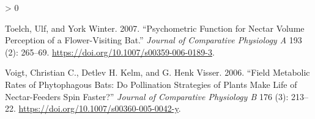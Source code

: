 \documentclass[
]{article}
\newlength{\cslhangindent}
\newenvironment{CSLReferences}[2] %
 {%
  \setlength{\parindent}{0pt}
  \ifodd #1 \everypar{\setlength{\hangindent}{\cslhangindent}}\ignorespaces\fi
  \ifnum #2 > 0
  \setlength{\parskip}{#2\baselineskip}
  \fi
 }%
 {}
\begin{document}
\begin{CSLReferences}{1}{0}
\leavevmode\hypertarget{ref-toelch_psychometric_2007}{}%
Toelch, Ulf, and York Winter. 2007. {``Psychometric Function for Nectar Volume Perception of a Flower-Visiting Bat.''} \emph{Journal of Comparative Physiology A} 193 (2): 265--69. \url{https://doi.org/10.1007/s00359-006-0189-3}.

\leavevmode\hypertarget{ref-voigt_field_2006}{}%
Voigt, Christian C., Detlev H. Kelm, and G. Henk Visser. 2006. {``Field Metabolic Rates of Phytophagous Bats: Do Pollination Strategies of Plants Make Life of Nectar-Feeders Spin Faster?''} \emph{Journal of Comparative Physiology B} 176 (3): 213--22. \url{https://doi.org/10.1007/s00360-005-0042-y}.

\end{CSLReferences}
\end{document}
